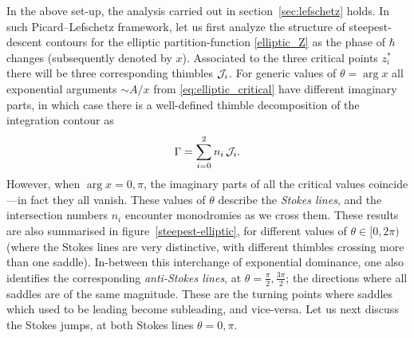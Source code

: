\documentclass[11pt,a4paper]{article}
\newcommand{\CJ}{{\cal J}}
\newcommand{\be}{\begin{equation}}
\newcommand{\ee}{\end{equation}}
\begin{document}
In the above set-up, the analysis carried out in section~\ref{sec:lefschetz} holds. In such Picard--Lefschetz framework, let us first analyze the structure of steepest-descent contours for the elliptic partition-function \eqref{elliptic_Z} as the phase of $\hbar$ changes (subsequently denoted by $x$). Associated to the three critical points $z^*_i$ there will be three corresponding thimbles $\CJ_i$. For generic values of $\theta=\arg x$ all exponential arguments $\sim A/x$ from \eqref{eq:elliptic_critical} have different imaginary parts, in which case there is a well-defined thimble decomposition of the integration contour as
%
\be
\label{thimbledecompositionelliptic}
\Gamma = \sum_{i=0}^{2} n_i\, \CJ_i.
\ee
%
\noindent
However, when $\arg x = 0, \pi$, the imaginary parts of all the critical values coincide---in fact they all vanish. These values of $\theta$ describe the \textit{Stokes lines}, and the intersection numbers $n_i$ encounter monodromies as we cross them. These results are also summarised in figure~\ref{steepest-elliptic}, for different values of $\theta \in [0,2\pi)$ (where the Stokes lines are very distinctive, with different thimbles crossing more than one saddle). In-between this interchange of exponential dominance, one also identifies the corresponding \textit{anti-Stokes lines}, at $\theta = \frac{\pi}{2}, \frac{3\pi}{2}$; the directions where all saddles are of the same magnitude. These are the turning points where saddles which used to be leading become subleading, and vice-versa. Let us next discuss the Stokes jumps, at both Stokes lines $\theta=0, \pi$. 
\end{document}
